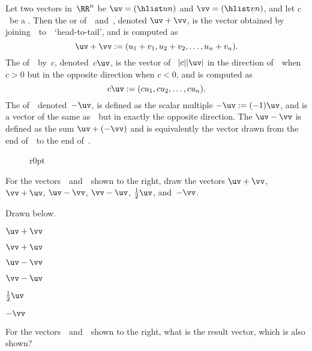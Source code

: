 \begin{definition} \label{def:vecops}
Let two vectors in~\(\RR^n\) be \(\uv=(\hlist un)\) and \(\vv=(\hlist vn)\), and let \(c\)~be a .
Then the  or  of~\uv\ and~\vv, denoted \(\uv+\vv\), is the vector obtained by joining~\vv\ to~\uv\ `head-to-tail', and is computed as
\begin{equation*}
\uv+\vv:=(u_1+v_1,u_2+v_2,\ldots,u_n+v_n).
\end{equation*}
The  of~\uv\ by~\(c\), denoted~\(c\uv\),  is the vector of ~\(|c||\uv|\) in the direction of~\uv\ when \(c>0\) but in the opposite direction when \(c<0\), and is computed as
\begin{equation*}
c\uv:=(cu_1,cu_2,\ldots,cu_n).
\end{equation*}
The  of~\uv\, denoted~\(-\uv\), is defined as the scalar multiple \(-\uv:=(-1)\uv\), and is a vector of the same  as~\uv\ but in exactly the opposite direction.
The  \(\uv-\vv\) is defined as the sum \(\uv+(-\vv)\) and is equivalently the vector drawn from the end of~\vv\ to the end of~\uv.
\end{definition}


\begin{wrapfigure}r{0pt}
\end{wrapfigure}
\begin{example} 
For the vectors~\uv\ and~\vv\ shown to the right, draw the vectors
\(\uv+\vv\), \(\vv+\uv\), \(\uv-\vv\), \(\vv-\uv\), \(\tfrac12\uv\), and~\(-\vv\).

\begin{solution} Drawn below.
\begin{Parts}
\item $\uv+\vv$ 
\item $\vv+\uv$ 
\item $\uv-\vv$ 
\item $\vv-\uv$ 
\item $\tfrac12\uv$ 
\item $-\vv$ 
\end{Parts}
\end{solution}
\end{example}


\begin{activity}[\vecops45{-2}14]
For the vectors~\uv\ and~\vv\ shown to the right, what is the result vector, which is also shown?
\actposs[4]{\(\vv-\uv\)}{\(\uv+\vv\)}{\(\vv+\uv\)}{\(\uv-\vv\)}
\vspace{1ex}
\end{activity}



